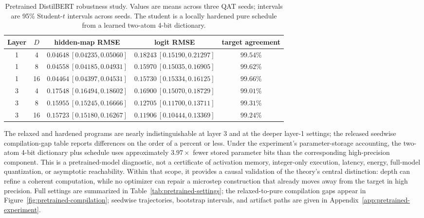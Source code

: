 \documentclass[twoside,11pt]{article}
\begin{document}
\begin{table}[t]
\centering
\caption{Pretrained DistilBERT robustness study. Values are means across three QAT seeds; intervals are 95\% Student-$t$ intervals across seeds. The student is a locally hardened pure schedule from a learned two-atom 4-bit dictionary.}
\label{tab:pretrained-qat}
\small
\begin{tabular}{ccccc}
\toprule
Layer & $D$ & hidden-map RMSE & logit RMSE & target agreement \\
\midrule
1 & 4  & $0.04648\ [0.04235,0.05060]$ & $0.18243\ [0.15190,0.21297]$ & $99.54\%$\\
1 & 8  & $0.04558\ [0.04185,0.04931]$ & $0.15970\ [0.15035,0.16905]$ & $99.62\%$\\
1 & 16 & $0.04464\ [0.04397,0.04531]$ & $0.15730\ [0.15334,0.16125]$ & $99.66\%$\\
3 & 4  & $0.17548\ [0.16494,0.18602]$ & $0.16900\ [0.15070,0.18729]$ & $99.01\%$\\
3 & 8  & $0.15955\ [0.15245,0.16666]$ & $0.12705\ [0.11700,0.13711]$ & $99.31\%$\\
3 & 16 & $0.15723\ [0.15180,0.16267]$ & $0.11906\ [0.10444,0.13369]$ & $99.24\%$\\
\bottomrule
\end{tabular}
\end{table}

The relaxed and hardened programs are nearly indistinguishable at layer 3 and at the deeper layer-1 settings; the released seedwise compilation-gap table reports differences on the order of a percent or less.  Under the experiment's parameter-storage accounting, the two-atom 4-bit dictionary plus schedule uses approximately $3.97\times$ fewer stored parameter bits than the corresponding high-precision component.  This is a pretrained-model diagnostic, not a certificate of activation memory, integer-only execution, latency, energy, full-model quantization, or asymptotic reachability.  Within that scope, it provides a causal validation of the theory's central distinction: depth can refine a coherent computation, while no optimizer can repair a microstep construction that already moves away from the target in high precision.  Full settings are summarized in Table~\ref{tab:pretrained-settings}; the relaxed-to-pure compilation gaps appear in Figure~\ref{fig:pretrained-compilation}; seedwise trajectories, bootstrap intervals, and artifact paths are given in Appendix~\ref{app:pretrained-experiment}.

\FloatBarrier
\end{document}
